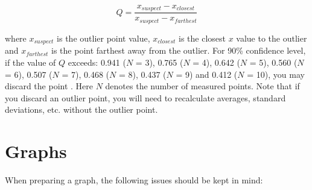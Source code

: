 \documentclass[byrevtex,amssymb,aps,pra,floatfix,letterpaper]{revtex4}
\begin{document}
\begin{equation}
\label{eq10a}
Q = \frac{x_{suspect} - x_{closest}}{x_{suspect} - x_{farthest}}
\end{equation}

\noindent
where $x_{suspect}$ is the outlier point value, $x_{closest}$ is the closest $x$ value to the outlier and $x_{farthest}$ is the point farthest away from the outlier. For 90\% confidence level, if the value of $Q$ exceeds: 0.941 ($N$ = 3), 0.765 ($N$ = 4), 0.642 ($N$ = 5), 0.560 ($N$ = 6), 0.507 ($N$ = 7), 0.468 ($N$ = 8), 0.437 ($N$ = 9) and 0.412 ($N$ = 10), you may discard the point \cite{MCBANE}. Here $N$ denotes the number of measured points. Note that if you discard an outlier point, you will need to recalculate averages, standard deviations, etc. without the outlier point.

\section{Graphs}

When preparing a graph, the following issues should be kept in mind:
\end{document}
